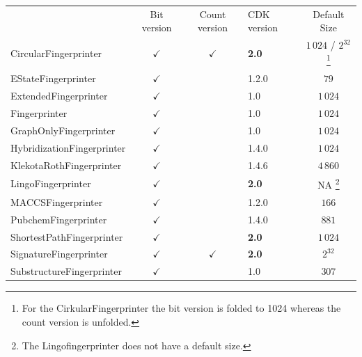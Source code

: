 \documentclass[10pt]{bmcart}
\def \cdkversion {\textbf{2.0}}
\begin{document}
\begin{backmatter}
    \begin{minipage}{1\textwidth}
    \renewcommand*{\thempfootnote}{\fnsymbol{mpfootnote}}
    \centering
    \begin{tabular}{lcclc}
                             & Bit version  & Count version & CDK version & Default Size    \\
  CircularFingerprinter~\cite{rogers2010extended, Clark2014}      & $\checkmark$ & $\checkmark$  & \cdkversion{}     & $1\,024$ / $2^{32}$%
\footnote[1]{For the CirkularFingerprinter the bit version is folded to 1024 whereas the count version is unfolded.} \\
  EStateFingerprinter~\cite{Hall1995}       & $\checkmark$ &               & 1.2.0       & $79$            \\
  ExtendedFingerprinter      & $\checkmark$ &               & 1.0         & $1\,024$        \\
  Fingerprinter              & $\checkmark$ &               & 1.0         & $1\,024$        \\
  GraphOnlyFingerprinter     & $\checkmark$ &               & 1.0         & $1\,024$        \\
  HybridizationFingerprinter & $\checkmark$ &               & 1.4.0       & $1\,024$        \\
  KlekotaRothFingerprinter~\cite{Klekota2008}   & $\checkmark$ &               & 1.4.6       & $4\,860$        \\
  LingoFingerprinter~\cite{vidal2005lingo}         & $\checkmark$ &               & \cdkversion{}     & NA%
\footnote[2]{The Lingofingerprinter does not have a default size.}
                                                                                             \\
  MACCSFingerprinter         & $\checkmark$ &               & 1.2.0       & $166$           \\
  PubchemFingerprinter~\cite{pubchemFP}       & $\checkmark$ &               & 1.4.0       & $881$            \\
  ShortestPathFingerprinter  & $\checkmark$ &               & \cdkversion{}     & $1\,024$        \\
  SignatureFingerprinter~\cite{signaturefingerprints}     & $\checkmark$ & $\checkmark$  & \cdkversion{}     & $2^{32}$         \\
  SubstructureFingerprinter  & $\checkmark$ &               & 1.0         & $307$           \\

    \end{tabular}
    \end{minipage}


\end{backmatter}
\end{document}
